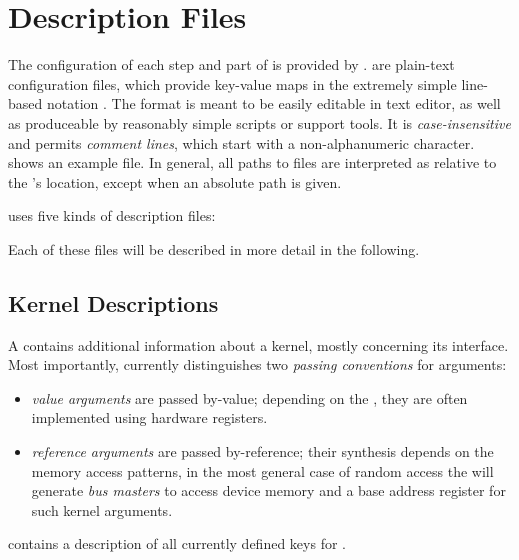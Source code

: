 \section{Description Files}\label{sec:description-files}%
The configuration of each step and part of \tapasco{} is provided by .
 are plain-text configuration files, which provide key-value maps in the extremely simple line-based notation .
The format is meant to be easily editable in text editor, as well as produceable by reasonably simple scripts or support tools.
It is \emph{case-insensitive} and permits \emph{comment lines}, which start with a non-alphanumeric character.  shows an example file.
In general, all paths to files are interpreted as relative to the 's location, except when an absolute path is given.
%

%
\tapasco{} uses five kinds of description files:

\begin{compactenum}
  \item {}
  \item {}
  \item {}
  \item {}
  \item {}
\end{compactenum}
Each of these files will be described in more detail in the following.

\subsection{Kernel Descriptions}
A  contains additional information about a kernel, mostly concerning its interface.
Most importantly, \tapasco{} currently distinguishes two \emph{passing conventions} for arguments:
%
\begin{itemize}
  \item \emph{value arguments} are passed by-value; depending on the , they are often implemented using hardware registers.
  \item \emph{reference arguments} are passed by-reference; their synthesis depends on the memory access patterns, in the most general case of random access the  will generate \emph{bus masters} to access device memory and a base address register for such kernel arguments.
\end{itemize}
 contains a description of all currently defined keys for .

